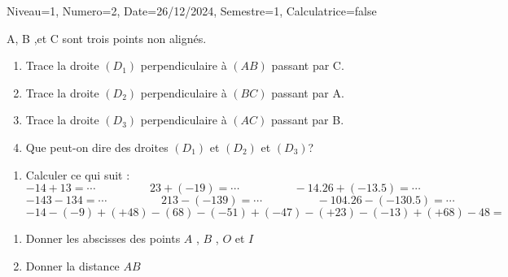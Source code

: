 \documentclass[a4paper,12pt]{article}
\begin{document}
\begin{Maquette}[DS]{Niveau=1, Numero=2, Date=26/12/2024, Semestre=1, Calculatrice=false}

\begin{exercice}
\begin{minipage}{.68\linewidth}
A, B ,et C sont trois points non alignés. 
\begin{enumerate}
\item{} Trace la droite $(D_{1})$ perpendiculaire à $(AB)$ passant par C.
\item{} Trace la droite $(D_{2})$ perpendiculaire à $(BC)$ passant par A.
\item{} Trace la droite $(D_{3})$ perpendiculaire à $(AC)$ passant par B.
\item{} Que peut-on dire des droites $(D_{1})$ et $(D_{2})$ et $(D_{3})$?
\end{enumerate}
\end{minipage}
\begin{minipage}{.3\linewidth}
\end{minipage}

\anserline[2]
\end{exercice}

\begin{exercice}
\begin{enumerate}
\item{} Calculer ce qui suit : 
\[-14+13=\cdots \hspace{2cm}
	23+(-19)=\cdots \hspace{2cm}
	-14.26+(-13.5)=\cdots
\]
\[-143-134=\cdots \hspace{2cm}
	213-(-139)=\cdots \hspace{2cm}
	-104.26-(-130.5)=\cdots
\]
\[-14-(-9)+(+48)-(68)-(-51)+(-47)-(+23)-(-13)+(+68)-48=
\]\anserline[4]
\end{enumerate}
\end{exercice}

\begin{exercice}
\begin{enumerate}
\item{} Donner les abscisses des points $A$ , $B$ , $O$ et $I$ 
\item{} Donner la distance $AB$
\end{enumerate}


\end{exercice}
\end{Maquette}
\end{document}
